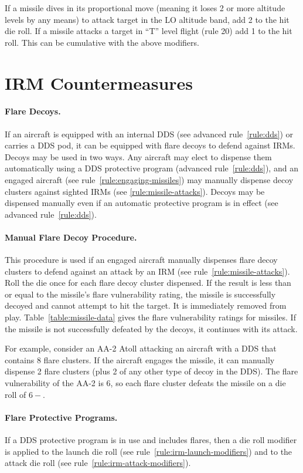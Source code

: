 {If a missile dives in its proportional move (meaning it loses 2 or more altitude levels by any means) to attack target in the LO altitude band, add 2 to the hit die roll. If a missile attacks a target in “T” level flight (rule 20) add 1 to the hit roll. This can be cumulative with the above modifiers.

}{

\section{IRM Countermeasures}
\label{rule:irm-countermeasures}

\paragraph{Flare Decoys.} 
If an aircraft is equipped with an internal DDS (see advanced rule~\ref{rule:dds}) or carries a DDS pod, it can be equipped with flare decoys to defend against IRMs. Decoys may be used in two ways. Any aircraft may elect to dispense them automatically using a DDS protective program (advanced rule~\ref{rule:dds}), and an engaged aircraft (see rule~\ref{rule:engaging-missiles}) may manually dispense decoy clusters against sighted IRMs (see \ref{rule:missile-attacks}). Decoys may be dispensed manually even if an automatic protective program is in effect (see advanced rule~\ref{rule:dds}).

\paragraph{Manual Flare Decoy Procedure.} This procedure is used if an engaged aircraft manually dispenses flare decoy clusters to defend against an attack by an IRM (see rule~\ref{rule:missile-attacks}). Roll the die once for each flare decoy cluster dispensed. If the result is less than or equal to the missile's flare vulnerability rating, the missile is successfully decoyed and cannot attempt to hit the target. It is immediately removed from play. Table~\ref{table:missile-data} gives the flare vulnerability ratings for missiles. If the missile is not successfully defeated by the decoys, it continues with its attack.

For example, consider an AA-2 Atoll attacking an aircraft with a DDS that contains 8 flare clusters. If the aircraft engages the missile, it can manually dispense 2 flare clusters (plus 2 of any other type of decoy in the DDS). The flare vulnerability of the AA-2 is 6, so each flare cluster defeats the missile on a die roll of $6-$.

\paragraph{Flare Protective Programs.} If a DDS protective program is in use and includes flares, then a die roll modifier is applied to the launch die roll (see rule~\ref{rule:irm-launch-modifiers}) and to the attack die roll (see rule~\ref{rule:irm-attack-modifiers}).
}

